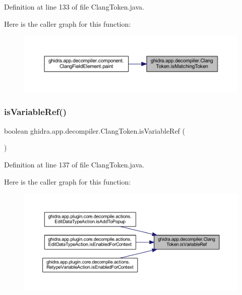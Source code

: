 Definition at line 133 of file Clang\+Token.\+java.

Here is the caller graph for this function\+:
\nopagebreak
\begin{figure}[H]
\begin{center}
\leavevmode
\includegraphics[width=350pt]{classghidra_1_1app_1_1decompiler_1_1_clang_token_af3a83e7be8996293de2312e2a802e42b_icgraph}
\end{center}
\end{figure}
\mbox{\label{classghidra_1_1app_1_1decompiler_1_1_clang_token_a57eb2eafbb303ab28ee52d815e7c1f4c}} 
\subsubsection{\texorpdfstring{isVariableRef()}{isVariableRef()}}
{\footnotesize\ttfamily boolean ghidra.\+app.\+decompiler.\+Clang\+Token.\+is\+Variable\+Ref (\begin{DoxyParamCaption}{ }\end{DoxyParamCaption})\hspace{0.3cm}{\ttfamily [inline]}}



Definition at line 137 of file Clang\+Token.\+java.

Here is the caller graph for this function\+:
\nopagebreak
\begin{figure}[H]
\begin{center}
\leavevmode
\includegraphics[width=350pt]{classghidra_1_1app_1_1decompiler_1_1_clang_token_a57eb2eafbb303ab28ee52d815e7c1f4c_icgraph}
\end{center}
\end{figure}
\mbox{\label{classghidra_1_1app_1_1decompiler_1_1_clang_token_a32dba894529a2a7bb3aa7ba488b63af2}} 
